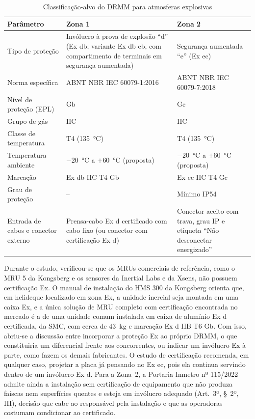 \documentclass[a4paper, 12pt]{article}
\begin{document}
\begin{table}[H]
    \centering
    \caption{Classificação-alvo do DRMM para atmosferas explosivas}
    \label{tab:alvo}
    \renewcommand{\arraystretch}{1.3}
    \begin{tabularx}{\textwidth}{|>{\raggedright\arraybackslash}p{3.4cm}|>{\raggedright\arraybackslash}X|>{\raggedright\arraybackslash}X|}
        \hline
        \centering\arraybackslash\textbf{Parâmetro} & \centering\arraybackslash\textbf{Zona 1} & \centering\arraybackslash\textbf{Zona 2} \\ \hline
        Tipo de proteção & Invólucro à prova de explosão ``d'' (Ex db; variante Ex db eb, com compartimento de terminais em segurança aumentada) & Segurança aumentada ``e'' (Ex ec) \\ \hline
        Norma específica & ABNT NBR IEC 60079-1:2016 & ABNT NBR IEC 60079-7:2018 \\ \hline
        Nível de proteção (EPL) & Gb & Gc \\ \hline
        Grupo de gás & IIC & IIC \\ \hline
        Classe de temperatura & T4 (135~°C) & T4 (135~°C) \\ \hline
        Temperatura ambiente & $-20$~°C a $+60$~°C (proposta) & $-20$~°C a $+60$~°C (proposta) \\ \hline
        Marcação & Ex db IIC T4 Gb & Ex ec IIC T4 Gc \\ \hline
        Grau de proteção & -- & Mínimo IP54 \\ \hline
        Entrada de cabos e conector externo & Prensa-cabo Ex d certificado com cabo fixo (ou conector com certificação Ex d) & Conector aceito com trava, grau IP e etiqueta ``Não desconectar energizado'' \\ \hline
    \end{tabularx}
\end{table}

Durante o estudo, verificou-se que os MRUs comerciais de referência, como o MRU 5 da Kongsberg e os sensores da Inertial Labs e da Xsens, não possuem certificação Ex. O manual de instalação do HMS 300 da Kongsberg orienta que, em helideque localizado em zona Ex, a unidade inercial seja montada em uma caixa Ex, e a única solução de MRU completo com certificação encontrada no mercado é a de uma unidade comum instalada em caixa de alumínio Ex d certificada, da SMC, com cerca de 43~kg e marcação Ex d IIB T6 Gb. Com isso, abriu-se a discussão entre incorporar a proteção Ex ao próprio DRMM, o que constituiria um diferencial frente aos concorrentes, ou indicar um invólucro Ex à parte, como fazem os demais fabricantes. O estudo de certificação recomenda, em qualquer caso, projetar a placa já pensando no Ex ec, pois ela continua servindo dentro de um invólucro Ex d. Para a Zona~2, a Portaria Inmetro nº 115/2022 admite ainda a instalação sem certificação de equipamento que não produza faíscas nem superfícies quentes e esteja em invólucro adequado (Art.~3º, §~2º, III), decisão que cabe ao responsável pela instalação e que as operadoras costumam condicionar ao certificado.
\end{document}
